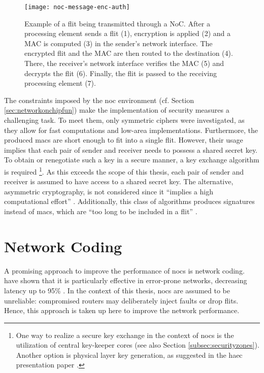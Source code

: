 \begin{figure}
    \centering
    \texttt{[image: noc-message-enc-auth]}
    \caption[Flit through NoC with encryption and authentication]{Example of a flit being transmitted through a NoC. After a processing element sends a flit (1),
    encryption is applied (2) and a MAC is computed (3) in the sender's network interface. The encrypted flit and the MAC are then routed to the
    destination (4). There, the receiver's network interface verifies the MAC (5) and decrypts the flit (6). Finally, the flit is passed to the
    receiving processing element (7).} %
    \label{fig:nocflitencauth}
\end{figure}

The constraints imposed by the \gls{noc} environment (cf. Section \ref{sec:networkonchipfun}) make the implementation of security measures a
challenging task. To meet them, only symmetric ciphers were investigated, as they allow for fast computations and low-area implementations.
Furthermore, the produced \glspl{mac} are short enough to fit into a single flit. However, their usage implies that each pair of
sender and receiver needs to possess a shared secret key. To obtain or renegotiate such a key in a secure manner, a key exchange algorithm is required
\footnote{One way to realize a secure key exchange in the context of \glspl{noc} is the utilization of central key-keeper cores
\cite{gebotys03securityframework} (see also Section \ref{subsec:securityzones}). Another option is physical layer key generation, as suggested in the
\gls{haec} presentation paper \cite[4]{matthiesen17haec}.}.
As this exceeds the scope of this thesis, each pair of sender and receiver is assumed to have access to a shared secret key. The alternative, asymmetric
cryptography, is not considered since it \enquote{implies a high computational effort} \cite[3]{moriam18activeattackers}. Additionally, this class of
algorithms produces signatures instead of \glspl{mac}, which are \enquote{too long to be included in a flit} \cite[3]{moriam18activeattackers}.

\section{Network Coding}\label{sec:networkcodingover}
A promising approach to improve the performance of \glspl{noc} is network coding. \citeauthor{moriam15manycorenc} have shown that it is particularly
effective in error-prone networks, decreasing latency up to 95\% \cite[7]{moriam15manycorenc}. In the context of this thesis, \glspl{noc} are assumed
to be unreliable: compromised routers may deliberately inject faults or drop flits. Hence, this approach is taken up here to improve the network
performance.

